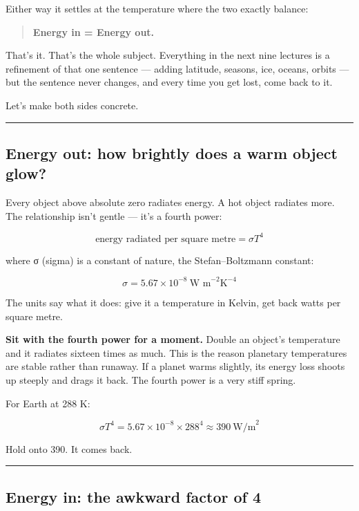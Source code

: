 Either way it settles at the temperature where the two exactly balance:

\begin{quote}
\textbf{Energy in = Energy out.}
\end{quote}

That's it. That's the whole subject. Everything in the next nine
lectures is a refinement of that one sentence --- adding latitude,
seasons, ice, oceans, orbits --- but the sentence never changes, and
every time you get lost, come back to it.

Let's make both sides concrete.

\begin{center}\rule{0.5\linewidth}{0.5pt}\end{center}

\subsection{Energy out: how brightly does a warm object
glow?}\label{energy-out-how-brightly-does-a-warm-object-glow}

Every object above absolute zero radiates energy. A hot object radiates
more. The relationship isn't gentle --- it's a fourth power:

\[ \text{energy radiated per square metre} = \sigma T^4 \]

where σ (sigma) is a constant of nature, the Stefan--Boltzmann constant:

\[ \sigma = 5.67 \times 10^{-8} \ \text{W m}^{-2}\text{K}^{-4} \]

The units say what it does: give it a temperature in Kelvin, get back
watts per square metre.

\textbf{Sit with the fourth power for a moment.} Double an object's
temperature and it radiates sixteen times as much. This is the reason
planetary temperatures are stable rather than runaway. If a planet warms
slightly, its energy loss shoots up steeply and drags it back. The
fourth power is a very stiff spring.

For Earth at 288 K:

\[ \sigma T^4 = 5.67 \times 10^{-8} \times 288^4 \approx 390 \ \text{W/m}^2 \]

Hold onto 390. It comes back.

\begin{center}\rule{0.5\linewidth}{0.5pt}\end{center}

\subsection{Energy in: the awkward factor of
4}\label{energy-in-the-awkward-factor-of-4}


